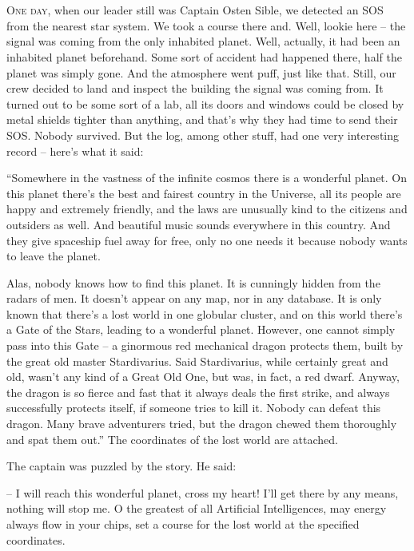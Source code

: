 \documentclass[ebook,twoside,final,openright]{memoir}
\begin{document}
\chapter{}
\par
\lettrine{O}{ne day,} when our leader still was Captain Osten Sible, we detected an SOS from the nearest star system. We took a course there and. Well, lookie here – the signal was coming from the only inhabited planet. Well, actually, it had been an inhabited planet beforehand. Some sort of accident had happened there, half the planet was simply gone. And the atmosphere went puff, just like that. Still, our crew decided to land and inspect the building the signal was coming from. It turned out to be some sort of a lab, all its doors and windows could be closed by metal shields tighter than anything, and that's why they had time to send their SOS. Nobody survived. But the log, among other stuff, had one very interesting record – here’s what it said:\par
\par
“Somewhere in the vastness of the infinite cosmos there is a wonderful planet. On this planet there’s the best and fairest country in the Universe, all its people are happy and extremely friendly, and the laws are unusually kind to the citizens and outsiders as well. And beautiful music sounds everywhere in this country. And they give spaceship fuel away for free, only no one needs it because nobody wants to leave the planet. \par
Alas, nobody knows how to find this planet. It is cunningly hidden from the radars of men. It doesn’t appear on any map, nor in any database. It is only known that there’s a lost world in one globular cluster, and on this world there’s a Gate of the Stars, leading to a wonderful planet. However, one cannot simply pass into this Gate – a ginormous red mechanical dragon protects them, built by the great old master Stardivarius. Said Stardivarius, while certainly great and old, wasn’t any kind of a Great Old One, but was, in fact, a red dwarf. Anyway, the dragon is so fierce and fast that it always deals the first strike, and always successfully protects itself, if someone tries to kill it. Nobody can defeat this dragon. Many brave adventurers tried, but the dragon chewed them thoroughly and spat them out.” The coordinates of the lost world are attached.\par
\par
The captain was puzzled by the story. He said:\par
– I will reach this wonderful planet, cross my heart! I'll get there by any means, nothing will stop me. O the greatest of all Artificial Intelligences, may energy always flow in your chips, set a course for the lost world at the specified coordinates.\par
\end{document}

